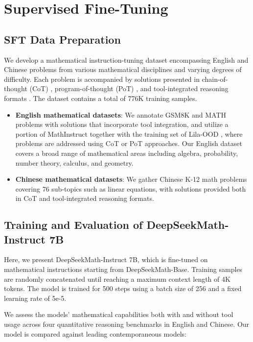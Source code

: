 \section{Supervised Fine-Tuning}

\subsection{SFT Data Preparation}

We develop a mathematical instruction-tuning dataset encompassing English and Chinese problems from various mathematical disciplines and varying degrees of difficulty. Each problem is accompanied by solutions presented in chain-of-thought (CoT) \citep{cot}, program-of-thought (PoT) \citep{pot,pal}, and tool-integrated reasoning formats \citep{tora}. The dataset contains a total of 776K training samples.

\begin{itemize}[topsep=0pt]
    \item \textbf{English mathematical datasets}: We annotate GSM8K and MATH problems with solutions that incorporate tool integration, and utilize a portion of MathInstruct \citep{MathInstruct} together with the training set of Lila-OOD \citep{lila}, where problems are addressed using CoT or PoT approaches. Our English dataset covers a broad range of mathematical areas including algebra, probability, number theory, calculus, and geometry.
    \item \textbf{Chinese mathematical datasets}: We gather Chinese K-12 math problems covering 76 sub-topics such as linear equations, with solutions provided both in CoT and tool-integrated reasoning formats.
\end{itemize}

\subsection{Training and Evaluation of DeepSeekMath-Instruct 7B}

Here, we present DeepSeekMath-Instruct 7B, which is fine-tuned on mathematical instructions starting from DeepSeekMath-Base. Training samples are randomly concatenated until reaching a maximum context length of 4K tokens. The model is trained for 500 steps using a batch size of 256 and a fixed learning rate of 5e-5.

We assess the models' mathematical capabilities both with and without tool usage across four quantitative reasoning benchmarks in English and Chinese. Our model is compared against leading contemporaneous models:

